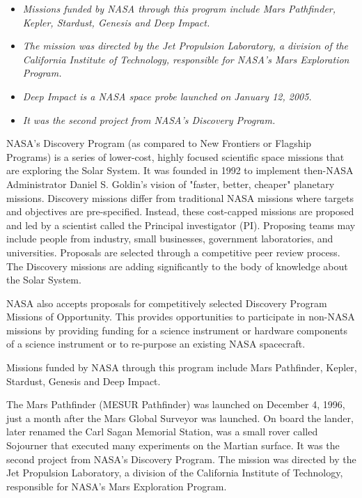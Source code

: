 \begin{itemize}
\item
  \emph{Missions funded by NASA through this program include Mars
  Pathfinder, Kepler, Stardust, Genesis and Deep Impact.}
\item
  \emph{The mission was directed by the Jet Propulsion Laboratory, a
  division of the California Institute of Technology, responsible for
  NASA's Mars Exploration Program.}
\item
  \emph{Deep Impact is a NASA space probe launched on January 12, 2005.}
\item
  \emph{It was the second project from NASA's Discovery Program.}
\end{itemize}

NASA's Discovery Program (as compared to New Frontiers or Flagship
Programs) is a series of lower-cost, highly focused scientific space
missions that are exploring the Solar System. It was founded in 1992 to
implement then-NASA Administrator Daniel S. Goldin's vision of "faster,
better, cheaper" planetary missions. Discovery missions differ from
traditional NASA missions where targets and objectives are
pre-specified. Instead, these cost-capped missions are proposed and led
by a scientist called the Principal investigator (PI). Proposing teams
may include people from industry, small businesses, government
laboratories, and universities. Proposals are selected through a
competitive peer review process. The Discovery missions are adding
significantly to the body of knowledge about the Solar System.

NASA also accepts proposals for competitively selected Discovery Program
Missions of Opportunity. This provides opportunities to participate in
non-NASA missions by providing funding for a science instrument or
hardware components of a science instrument or to re-purpose an existing
NASA spacecraft.

Missions funded by NASA through this program include Mars Pathfinder,
Kepler, Stardust, Genesis and Deep Impact.

The Mars Pathfinder (MESUR Pathfinder) was launched on December 4, 1996,
just a month after the Mars Global Surveyor was launched. On board the
lander, later renamed the Carl Sagan Memorial Station, was a small rover
called Sojourner that executed many experiments on the Martian surface.
It was the second project from NASA's Discovery Program. The mission was
directed by the Jet Propulsion Laboratory, a division of the California
Institute of Technology, responsible for NASA's Mars Exploration
Program.

